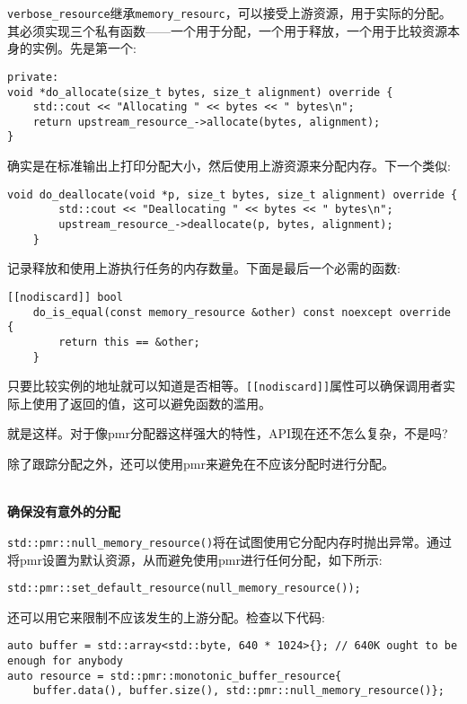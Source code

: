 \texttt{verbose\_resource}继承\texttt{memory\_resourc}，可以接受上游资源，用于实际的分配。其必须实现三个私有函数——一个用于分配，一个用于释放，一个用于比较资源本身的实例。先是第一个:

\begin{lstlisting}[style=styleCXX]
private:
void *do_allocate(size_t bytes, size_t alignment) override {
	std::cout << "Allocating " << bytes << " bytes\n";
	return upstream_resource_->allocate(bytes, alignment);
}
\end{lstlisting}

确实是在标准输出上打印分配大小，然后使用上游资源来分配内存。下一个类似:

\begin{lstlisting}[style=styleCXX]
	void do_deallocate(void *p, size_t bytes, size_t alignment) override {
		std::cout << "Deallocating " << bytes << " bytes\n";
		upstream_resource_->deallocate(p, bytes, alignment);
	}
\end{lstlisting}

记录释放和使用上游执行任务的内存数量。下面是最后一个必需的函数:

\begin{lstlisting}[style=styleCXX]
	[[nodiscard]] bool
	do_is_equal(const memory_resource &other) const noexcept override {
		return this == &other;
	}
\end{lstlisting}

只要比较实例的地址就可以知道是否相等。\texttt{[[nodiscard]]}属性可以确保调用者实际上使用了返回的值，这可以避免函数的滥用。

就是这样。对于像pmr分配器这样强大的特性，API现在还不怎么复杂，不是吗?

除了跟踪分配之外，还可以使用pmr来避免在不应该分配时进行分配。

\hspace*{\fill} \\ %
\noindent
\textbf{确保没有意外的分配}

\texttt{std::pmr::null\_memory\_resource()}将在试图使用它分配内存时抛出异常。通过将pmr设置为默认资源，从而避免使用pmr进行任何分配，如下所示:

\begin{lstlisting}[style=styleCXX]
std::pmr::set_default_resource(null_memory_resource());
\end{lstlisting}

还可以用它来限制不应该发生的上游分配。检查以下代码:

\begin{lstlisting}[style=styleCXX]
auto buffer = std::array<std::byte, 640 * 1024>{}; // 640K ought to be
enough for anybody
auto resource = std::pmr::monotonic_buffer_resource{
	buffer.data(), buffer.size(), std::pmr::null_memory_resource()};
\end{lstlisting}

